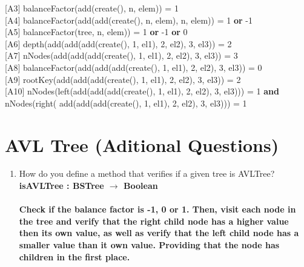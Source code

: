 \documentclass[12pt]{article}
\begin{document}
\begin{spacing}{1.5}
\hspace*{5mm} [A3]  balanceFactor(add(create(), n, elem)) = 1\\
\hspace*{5mm} [A4]  balanceFactor(add(add(create(), n, elem), n, elem)) = 1 \textbf{or} -1\\
\hspace*{5mm} [A5]  balanceFactor(tree, n, elem)) = 1 \textbf{or} -1 \textbf{or} 0\\
\hspace*{5mm} [A6]  depth(add(add(add(create(), 1, el1), 2, el2), 3, el3)) = 2\\
\hspace*{5mm} [A7] nNodes(add(add(add(create(), 1, el1), 2, el2), 3, el3)) = 3\\
\hspace*{5mm} [A8] balanceFactor(add(add(add(create(), 1, el1), 2, el2), 3, el3)) = 0 \\
\hspace*{5mm} [A9] rootKey(add(add(add(create(), 1, el1), 2, el2), 3, el3)) = 2\\
\hspace*{5mm} [A10] nNodes(left(add(add(add(create(), 1, el1), 2, el2), 3, el3))) = 1 \textbf{and}  nNodes(right( add(add(add(create(), 1, el1), 2, el2), 3, el3))) = 1\\

\section*{AVL Tree (Aditional Questions)}

\begin{enumerate}

\item How do you define a method that verifies if a given tree is AVLTree?\\
\textbf{isAVLTree : BSTree $\rightarrow$ Boolean} \\ \\
\textbf{Check if the balance factor is -1, 0 or 1. Then, visit each node in the tree and verify that the right child node has a higher value then its own value, as well as verify that the left child node has a smaller value than it own value. Providing that the node has children in the first place.}
  



\end{enumerate}
\end{spacing}
\end{document}
